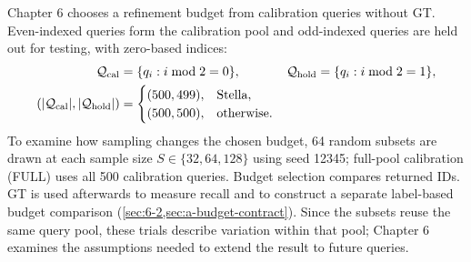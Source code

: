 Chapter 6 chooses a refinement budget from calibration queries without GT.
Even-indexed queries form the calibration pool and odd-indexed queries
are held out for testing, with zero-based indices:
\[
 \begin{aligned}
 \mathcal Q_{\rm cal}&=\{q_i:i\bmod2=0\},&
 \mathcal Q_{\rm hold}&=\{q_i:i\bmod2=1\},\\
 (|\mathcal Q_{\rm cal}|,|\mathcal Q_{\rm hold}|)
 &=\begin{cases}(500,499),&\text{Stella},\\(500,500),&\text{otherwise}.\end{cases}
 \end{aligned}
 \]
To examine how sampling changes the chosen budget, 64 random subsets
are drawn at each sample size $S\in\{32,64,128\}$ using seed 12345;
full-pool calibration (FULL) uses all 500 calibration queries. Budget
selection compares returned IDs. GT is used afterwards to measure recall
and to construct a separate label-based budget comparison
(\cref{sec:6-2,sec:a-budget-contract}). Since the subsets reuse the same
query pool, these trials describe variation within that pool; Chapter 6
examines the assumptions needed to extend the result to future queries.

